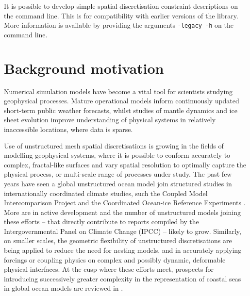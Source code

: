 \documentclass[a4paper, 10pt]{book}
\begin{document}
It is possible to develop simple spatial discretisation constraint descriptions on the command line.
This is for compatibility with earlier versions of the library.
More information is available by providing the arguments \verb+-legacy -h+ on the command line.


\chapter{Background motivation}
%
Numerical simulation models have become a vital tool
for scientists studying geophysical processes.
%
Mature operational models inform continuously updated short-term public weather forecasts,
whilst studies of mantle dynamics and ice sheet evolution improve understanding of physical systems in relatively inaccessible locations, where data is sparse.

Use of unstructured mesh spatial discretisations
is growing in the fields of modelling geophysical systems, 
where it is possible to conform accurately to complex, fractal-like surfaces and
vary spatial resolution to optimally capture the physical process, or multi-scale range of processes under study.
%
The past few years have seen
a global unstructured ocean model
\citep[FESOM,][]{sidorenko14}
join structured studies in
internationally coordinated climate studies,
such the 
Coupled Model Intercomparison Project \citep[CMIP,][]{meehl07,taylor12}
and
the
Coordinated Ocean-ice Reference Experiments
\citep[CORE][and accompanying studies in the \emph{Ocean Modelling} special issue]{coreii}.
More are in active development \citep[e.g.][]{ringler13} 
and the number of unstructured models joining these efforts
--
that directly contribute to
%
reports compiled by
the Intergovernmental Panel on Climate Change (IPCC)
--
likely to grow.
%
Similarly, on smaller scales,
the geometric flexibility of unstructured discretisations are being
applied
% 
to reduce the need for nesting models,
and in accurately applying forcings or coupling physics
\citep[e.g.][]{kimura13}
on complex and possibly dynamic, deformable physical interfaces.
%
At the cusp where these efforts meet, prospects for
introducing successively greater complexity
in the representation of coastal seas in global ocean models are reviewed in
\cite{holt17}.
\end{document}

